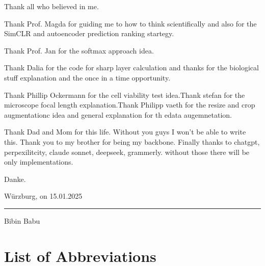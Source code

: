 \documentclass[12pt,twoside,a4paper,parskip]{scrbook} %
\begin{document}
Thank all who believed in me.

Thank Prof. Magda for guiding me to how to think scientifically and also for the SimCLR and autoencoder prediction ranking startegy.

Thank Prof. Jan for the softmax approach idea.

Thank Dalia for the code for sharp layer calculation and thanks for the biological stuff explanation and the once in a time opportunity.

Thank Phillip Ockermann for the cell viability test idea.Thank stefan for the microscope focal length explanation.Thank Philipp vaeth for the resize and crop augmentationc idea and general explanation for th edata augemnetation.

Thank Dad and Mom for this life. Without you guys I won't be able to write this. Thank you to my brother for being my backbone. Finally thanks to chatgpt, perpexilitcity, claude sonnet, deepseek, grammerly. without those there will be only implementations.

Danke.
\vspace{2em}

\hfill Würzburg, on 15.01.2025

\vspace{2em}

\noindent\rule{6cm}{0.4pt}

\vspace{0.5em}

\noindent Bibin Babu
\let\clearpage\relax
\chapter*{List of Abbreviations}
\begin{acronym}[UMAP] %
\end{acronym}

\tableofcontents

\listoffigures
{}

\listoftables
{}

\mainmatter
\end{document}
